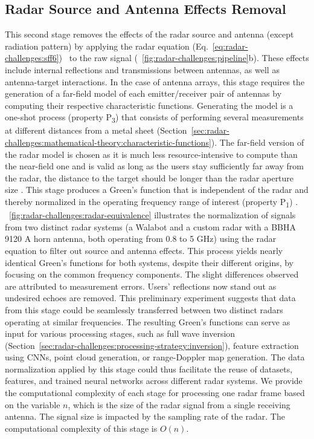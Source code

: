 \subsection{Radar Source and Antenna Effects Removal} \label{sec:radar-challenges:antenna-effects}
This second stage removes the effects of the radar source and antenna (except radiation pattern) by applying the radar equation (Eq.~\ref{eq:radar-challenges:sff6})~\cite{Lambot:2004,Lambot:2014} to the raw signal (\fig~\ref{fig:radar-challenges:pipeline}b). These effects include internal reflections and transmissions between antennas, as well as antenna-target interactions. In the case of antenna arrays, this stage requires the generation of a far-field model of each emitter/receiver pair of antennas by computing their respective characteristic functions. Generating the model is a one-shot process (property P\textsubscript{3}) that consists of performing several measurements at different distances from a metal sheet (Section~\ref{sec:radar-challenges:mathematical-theory:characteristic-functions}). The far-field version of the radar model is chosen as it is much less resource-intensive to compute than the near-field one and is valid as long as the users stay sufficiently far away from the radar, \ie the distance to the target should be longer than the radar aperture size \cite{Tran:2013}. This stage produces a Green's function that is independent of the radar and thereby normalized in the operating frequency range of interest (property P\textsubscript{1}) \cite{DeCoster:2018a}. 
%
\fig~\ref{fig:radar-challenges:radar-equivalence} illustrates the normalization of signals from two distinct radar systems (a Walabot and a custom radar with a BBHA 9120 A horn antenna, both operating from 0.8 to 5 GHz) using the radar equation to filter out source and antenna effects. This process yields nearly identical Green's functions for both systems, despite their different origins, by focusing on the common frequency components. The slight differences observed are attributed to measurement errors. Users' reflections now stand out as undesired echoes are removed. 
%
This preliminary experiment suggests that data from this stage could be seamlessly transferred between two distinct radars operating at similar frequencies. The resulting Green's functions can serve as input for various processing stages, such as full wave inversion (Section~\ref{sec:radar-challenges:processing-strategy:inversion}), feature extraction using CNNs, point cloud generation, or range-Doppler map generation. The data normalization applied by this stage could thus facilitate the reuse of datasets, features, and trained neural networks across different radar systems.
% 
We provide the computational complexity of each stage for processing one radar frame based on the variable $n$, which is the size of the radar signal from a single receiving antenna. The signal size is impacted by the sampling rate of the radar. 
The computational complexity of this stage is $O(n)$.

